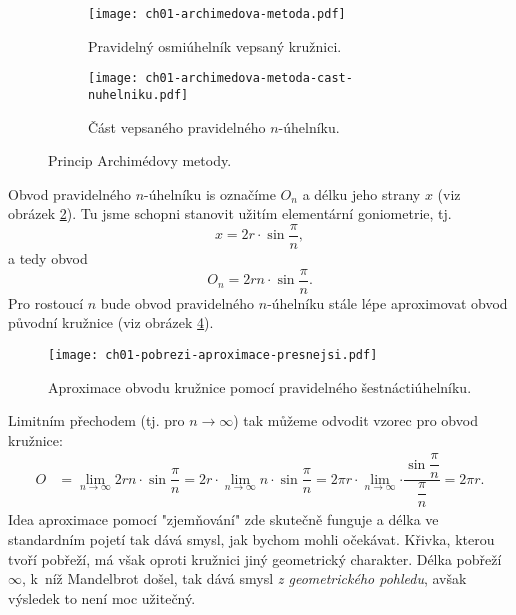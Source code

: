 \begin{figure}[h]
    \centering
    \begin{subfigure}{\subfigwidth}
        \centering
        \texttt{[image: ch01-archimedova-metoda.pdf]}
        \caption{Pravidelný osmiúhelník vepsaný kružnici.}
        \label{subfig:archimedova_metoda}
    \end{subfigure}
    \quad
    \begin{subfigure}{\subfigwidth}
        \centering
        \texttt{[image: ch01-archimedova-metoda-cast-nuhelniku.pdf]}
        \caption{Část vepsaného pravidelného $n$-úhelníku.}
        \label{subfig:archimedova_metoda_cast_nuhelniku}
    \end{subfigure}
    \caption{Princip Archimédovy metody.}
    \label{fig:princip_archimedovy_metody}
\end{figure}
Obvod pravidelného $n$-úhelníku is označíme $O_n$ a délku jeho strany $x$ (viz obrázek \ref{subfig:archimedova_metoda_cast_nuhelniku}). Tu jsme schopni stanovit užitím elementární goniometrie, tj.
\begin{equation*}
    x=2r\cdot\sin{\dfrac{\pi}{n}},
\end{equation*}
a tedy obvod
\begin{equation*}
    O_n=2rn\cdot\sin{\dfrac{\pi}{n}}.
\end{equation*}
Pro rostoucí $n$ bude obvod pravidelného $n$-úhelníku stále lépe aproximovat obvod původní kružnice (viz obrázek \ref{fig:archimedova_metoda_presnejsi}).
\begin{figure}[h]
    \centering
    \texttt{[image: ch01-pobrezi-aproximace-presnejsi.pdf]}
    \caption{Aproximace obvodu kružnice pomocí pravidelného šestnáctiúhelníku.}
    \label{fig:archimedova_metoda_presnejsi}
\end{figure}
Limitním přechodem (tj. pro $n\to\infty$) tak můžeme odvodit vzorec pro obvod kružnice:
\begin{align*}
    O&=\lim_{n\to\infty}{2rn\cdot\sin{\dfrac{\pi}{n}}}=2r\cdot\lim_{n\to\infty}{n\cdot\sin{\dfrac{\pi}{n}}}=2\pi r\cdot\lim_{n\to\infty}{\cdot\dfrac{\sin{\dfrac{\pi}{n}}}{\dfrac{\pi}{n}}}=2\pi r.
\end{align*}
Idea aproximace pomocí "zjemňování" zde skutečně funguje a délka ve standardním pojetí tak dává smysl, jak bychom mohli očekávat. Křivka, kterou tvoří pobřeží, má však oproti kružnici jiný geometrický charakter. Délka pobřeží $\infty$, k~níž Mandelbrot došel, tak dává smysl \emph{z geometrického pohledu}, avšak výsledek to není moc užitečný.